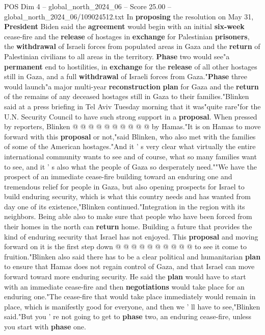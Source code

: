 \begin{textsample}{POS Dim 4 – global\_north\_2024\_06 – Score 25.00 – global\_north\_2024\_06/109024512.txt}
In \textbf{proposing} the resolution on May 31, \textbf{President} Biden said the \textbf{agreement} would begin with an initial \textbf{six-week} cease-fire and the \textbf{release} of hostages in \textbf{exchange} for Palestinian \textbf{prisoners}, the \textbf{withdrawal} of Israeli forces from populated areas in Gaza and the \textbf{return} of Palestinian civilians to all areas in the territory. \textbf{Phase} two would see"a \textbf{permanent} end to hostilities, in \textbf{exchange} for the \textbf{release} of all other hostages still in Gaza, and a full \textbf{withdrawal} of Israeli forces from Gaza."\textbf{Phase} three would launch"a major multi-year \textbf{reconstruction} \textbf{plan} for Gaza and the \textbf{return} of the remains of any deceased hostages still in Gaza to their families."Blinken said at a press briefing in Tel Aviv Tuesday morning that it was"quite rare"for the U.N.
Security Council to have such strong support in a \textbf{proposal}.
When pressed by reporters, Blinken @ @ @ @ @ @ @ @ @ @ by Hamas."It is on Hamas to move forward with this \textbf{proposal} or not,"said Blinken, who also met with the families of some of the American hostages."And it ' s very clear what virtually the entire international community wants to see and of course, what so many families want to see, and it ' s also what the people of Gaza so desperately need.""We have the prospect of an immediate cease-fire building toward an enduring one and tremendous relief for people in Gaza, but also opening prospects for Israel to build enduring security, which is what this country needs and has wanted from day one of its existence,"Blinken continued."Integration in the region with its neighbors.
Being able also to make sure that people who have been forced from their homes in the north can \textbf{return} home.
Building a future that provides the kind of enduring security that Israel has not enjoyed.
This \textbf{proposal} and moving forward on it is the first step down @ @ @ @ @ @ @ @ @ @ to see it come to fruition."Blinken also said there has to be a clear political and humanitarian \textbf{plan} to ensure that Hamas does not regain control of Gaza, and that Israel can move forward toward more enduring security.
He said the \textbf{plan} would have to start with an immediate cease-fire and then \textbf{negotiations} would take place for an enduring one."The cease-fire that would take place immediately would remain in place, which is manifestly good for everyone, and then we ' ll have to see,"Blinken said."But you ' re not going to get to \textbf{phase} two, an enduring cease-fire, unless you start with \textbf{phase} one.

\end{textsample}
